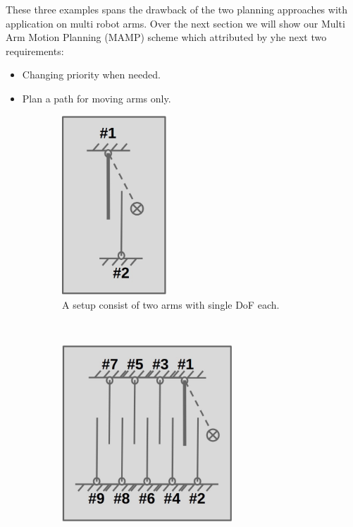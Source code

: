 \documentclass[english]{article}
\theoremstyle{definition}
\begin{document}
These three examples spans the drawback of the two planning approaches with application on multi robot arms. Over the next section we will show our Multi Arm Motion Planning (MAMP) scheme which attributed by yhe next two requirements:
\begin{itemize}
\item Changing priority when needed.
\item Plan a path for moving arms only.
\end{itemize}



\begin{figure}[t]
    \centering
    \begin{subfigure}[b]{0.3\textwidth}
    		\centering
        \includegraphics[width=0.43\textwidth]{TwoArmSingleJoint}
        \caption{A setup consist of two arms with single DoF each.}
        \label{fig:two_arm_scenario}
    \end{subfigure}
    ~~
    \begin{subfigure}[b]{0.3\textwidth}
    		\centering
        \includegraphics[width=0.7\textwidth]{MultiArmSingleJoint}

\end{subfigure}
\end{figure}
\end{document}
